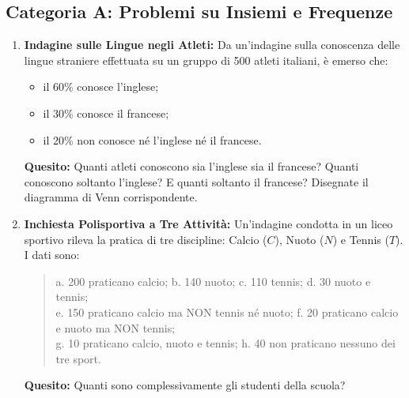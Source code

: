\documentclass[11pt, a4paper]{article}
\begin{document}
\subsection*{Categoria A: Problemi su Insiemi e Frequenze}
\begin{enumerate}
    \item \textbf{Indagine sulle Lingue negli Atleti:} Da un'indagine sulla conoscenza delle lingue straniere effettuata su un gruppo di 500 atleti italiani, è emerso che:
    \begin{itemize}
        \item il 60\% conosce l'inglese;
        \item il 30\% conosce il francese;
        \item il 20\% non conosce né l'inglese né il francese.
    \end{itemize}
    \textbf{Quesito:} Quanti atleti conoscono sia l'inglese sia il francese? Quanti conoscono soltanto l'inglese? E quanti soltanto il francese? Disegnate il diagramma di Venn corrispondente.
    
    \vspace{1.5cm}

    \item \textbf{Inchiesta Polisportiva a Tre Attività:} Un'indagine condotta in un liceo sportivo rileva la pratica di tre discipline: Calcio ($C$), Nuoto ($N$) e Tennis ($T$). I dati sono:
    \begin{quote}
    a. 200 praticano calcio; \quad b. 140 nuoto; \quad c. 110 tennis; \quad d. 30 nuoto e tennis; \\
    e. 150 praticano calcio ma NON tennis né nuoto; \quad f. 20 praticano calcio e nuoto ma NON tennis; \\
    g. 10 praticano calcio, nuoto e tennis; \quad h. 40 non praticano nessuno dei tre sport.
    \end{quote}
    \textbf{Quesito:} Quanti sono complessivamente gli studenti della scuola?
    
    \vspace{1.2cm}
\end{enumerate}
\end{document}
